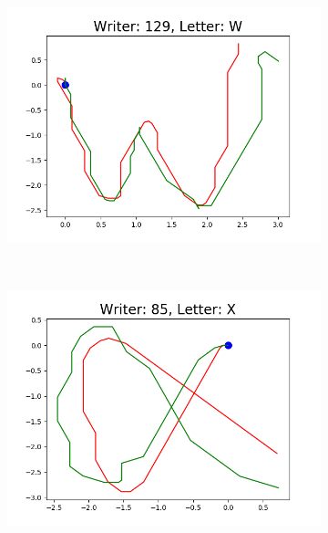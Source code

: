 \begin{figure}
\begin{subfigure}[b]{0.17\textwidth}
          \includegraphics[width=\textwidth]{images/framework/comparison_figures/W_129.png}
      \end{subfigure}
      ~
      \begin{subfigure}[b]{0.17\textwidth}
          \includegraphics[width=\textwidth]{images/framework/comparison_figures/X_85.png}
      \end{subfigure}
      ~
      \begin{subfigure}[b]{0.17\textwidth}

\end{subfigure}
\end{figure}
